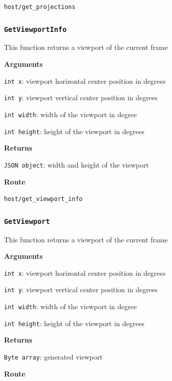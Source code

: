 \documentclass{article}
\begin{document}
\texttt{host/get_projections}


\subsubsection*{\texttt{GetViewportInfo}}

This function returns a viewport of the current frame

\textbf{Arguments}

\texttt{int x}: viewport horizontal center position in degrees

\texttt{int y}: viewport vertical center position in degrees
        
\texttt{int width}: width of the viewport in degree
        
\texttt{int height}: height of the viewport in degrees

\textbf{Returns}

\texttt{JSON object}: width and height of the viewport

\textbf{Route}

\texttt{host/get_viewport_info}


\subsubsection*{\texttt{GetViewport}}

This function returns a viewport of the current frame

\textbf{Arguments}

\texttt{int x}: viewport horizontal center position in degrees

\texttt{int y}: viewport vertical center position in degrees
        
\texttt{int width}: width of the viewport in degree
        
\texttt{int height}: height of the viewport in degrees

\textbf{Returns}

\texttt{Byte array}: generated viewport

\textbf{Route}
\end{document}
